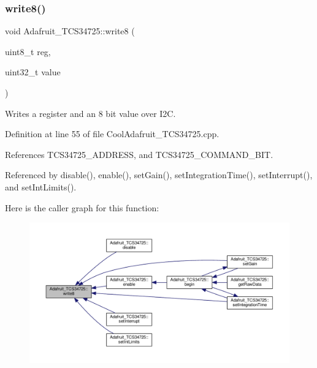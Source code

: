 \subsubsection{\texorpdfstring{write8()}{write8()}}
{\footnotesize\ttfamily void Adafruit\+\_\+\+T\+C\+S34725\+::write8 (\begin{DoxyParamCaption}\item[{uint8\+\_\+t}]{reg,  }\item[{uint32\+\_\+t}]{value }\end{DoxyParamCaption})}



Writes a register and an 8 bit value over I2C. 



Definition at line 55 of file Cool\+Adafruit\+\_\+\+T\+C\+S34725.\+cpp.



References T\+C\+S34725\+\_\+\+A\+D\+D\+R\+E\+SS, and T\+C\+S34725\+\_\+\+C\+O\+M\+M\+A\+N\+D\+\_\+\+B\+IT.



Referenced by disable(), enable(), set\+Gain(), set\+Integration\+Time(), set\+Interrupt(), and set\+Int\+Limits().

Here is the caller graph for this function\+:\nopagebreak
\begin{figure}[H]
\begin{center}
\leavevmode
\includegraphics[width=350pt]{df/d54/class_adafruit___t_c_s34725_aa526557ad0d76b3b6e31e6197de583e6_icgraph}
\end{center}
\end{figure}
\mbox{\label{class_adafruit___t_c_s34725_a3ffafbdd475d6baf9abda8dd067b5319}} 
